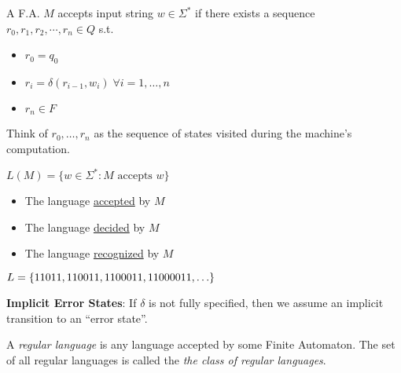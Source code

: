 \begin{definition}
    A F.A. $M$ accepts input string $w \in \Sigma^*$ if there exists a sequence $r_0, r_1, r_2, \cdots, r_n \in Q$ s.t.

    \begin{itemize}
        \item $r_0 = q_0$
        \item $r_i = \delta(r_{i-1}, w_i) \; \forall i = 1, \ldots, n$
        \item $r_n \in F$
    \end{itemize}

    Think of $r_0, \ldots, r_n$ as the sequence of states visited during the machine's computation.

    $L(M) = \{w \in \Sigma^*: M \text{ accepts } w\}$

    \begin{itemize}
        \item The language \underline{accepted} by $M$
        \item The language \underline{decided} by $M$
        \item The language \underline{recognized} by $M$
    \end{itemize}

\end{definition}

$L = \left \{ 11011, 110011, 1100011, 11000011, \ldots \right \}$

\textbf{Implicit Error States}: If $\delta$ is not fully specified, then we assume an implicit transition to an ``error state''.

\begin{definition}
    A \emph{regular language} is any language accepted by some Finite Automaton. The set of all regular languages is called the \emph{the class of regular languages}.
\end{definition}

\backmatter
